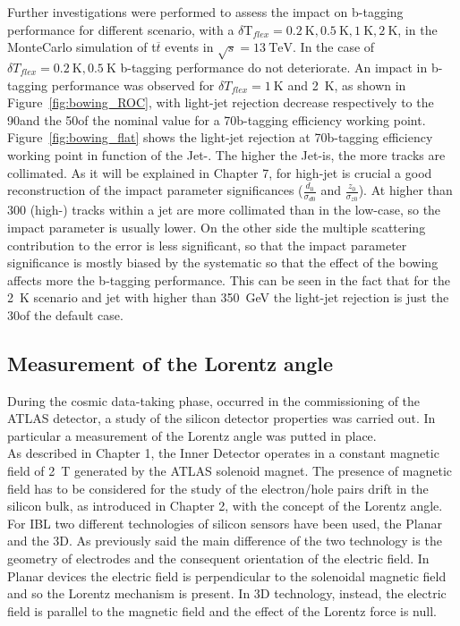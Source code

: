 Further investigations were performed to assess the impact on b-tagging performance for different scenario, with a $\delta$T$_{flex} = \SI{0.2}{\kelvin}, \SI{0.5}{\kelvin}, \SI{1}{\kelvin}, \SI{2}{\kelvin}$, in the MonteCarlo simulation of t$\overline{t}$ events in $\sqrt{s} = \SI{13}{\TeV}$. In the case of $\delta T_{flex} = \SI{0.2}{\kelvin}, \SI{0.5}{\kelvin}$ b-tagging performance do not deteriorate. An impact in b-tagging performance was observed for $\delta T_{flex} = \SI{1}{\kelvin}$ and \SI{2}{\kelvin}, as shown in Figure~\ref{fig:bowing_ROC}, with light-jet rejection decrease respectively to the 90\percent and the 50\percent of the nominal value for a 70\percent b-tagging efficiency working point. Figure~\ref{fig:bowing_flat} shows the light-jet rejection at 70\percent b-tagging efficiency working point in function of the Jet-\pt. The higher the Jet-\pt is, the more tracks are collimated. As it will be explained in Chapter 7, for high-\pt  jet is crucial a good reconstruction of the impact parameter significances ($\frac{d_0}{\sigma_{d0}}$ and $\frac{z_0}{\sigma_{z0}}$). At \pt higher than 300 \GeV (high-\pt) tracks within a jet are more collimated than in the low-\pt  case, so the impact parameter is usually lower. On the other side the multiple scattering contribution to the error is less significant, so that the impact parameter significance is mostly biased by the systematic
so that the effect of the bowing affects more the b-tagging performance. This can be seen in the fact that for the \SI{2}{\kelvin} scenario and jet with \pt higher than \SI{350}{\GeV} the light-jet rejection is just the 30\percent of the default case. \\

\subsection{Measurement of the Lorentz angle}
During the cosmic data-taking phase, occurred in the commissioning of the ATLAS detector, a study of the silicon detector properties was carried out. In particular a measurement of the Lorentz angle was putted in place.\\
As described in Chapter 1, the Inner Detector operates in a constant magnetic field of \SI{2}{\tesla} generated by the ATLAS solenoid magnet. 
The presence of magnetic field has to be considered for the study of the electron/hole pairs drift in the silicon bulk, as introduced in Chapter 2, with the concept of the Lorentz angle.\\
For IBL two different technologies of silicon sensors have been used, the Planar and the 3D. As previously said the main difference of the two technology is the geometry of electrodes and the consequent orientation of the electric field. In Planar devices the electric field is perpendicular to the solenoidal magnetic field and so the Lorentz mechanism is present. In 3D technology, instead, the electric field is parallel to the magnetic field and the effect of the Lorentz force is null.\\


